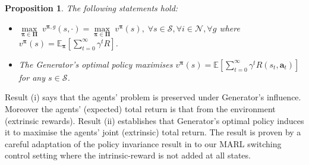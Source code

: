 \documentclass{article}
\newtheorem{proposition}{Proposition}
\begin{document}
\begin{proposition}
\label{preservation_lemma} The following statements hold:
\begin{itemize}
    \item [i)] $
\underset{\boldsymbol{\pi}\in\boldsymbol{\Pi}}{\max}\; v^{\boldsymbol{\pi},g}(s,\cdot)=\underset{\boldsymbol{\pi}\in\boldsymbol{\Pi}}{\max}\; v^{\boldsymbol{\pi}}(s),\;\forall s\in\mathcal{S}, \forall i \in\mathcal{N}, \forall g$ where $v^{\boldsymbol{\pi}}(s)=\mathbb{E}_{\boldsymbol{\pi}}\left[\sum_{t=0}^\infty \gamma^tR\right]$.
\hspace{-8 mm}\item [ii)] The {\selectfont Generator}'s optimal policy maximises $v^{\boldsymbol{\pi}}(s)=\mathbb{E}\left[\sum_{t=0}^\infty \gamma^tR(s_t,\boldsymbol{a}_t)\right]$ for any
$s\in\mathcal{S}$. 
\end{itemize}

\end{proposition}
Result (i) says that the agents' problem is preserved under {\selectfont Generator}'s influence. Moreover the agents' (expected) total return is that from the environment (extrinsic rewards). Result (ii) establishes that {\selectfont Generator}'s optimal policy induces it to maximise the agents' joint (extrinsic) total return. The result is proven by a careful adaptation of the policy invariance result in \cite{ng1999policy} to our MARL switching control setting where the intrinsic-reward is not added at all states. %

\end{document}
